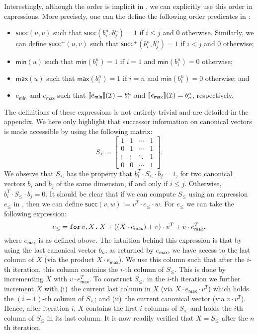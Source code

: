 Interestingly, although the order is implicit in \langfor, we can explicitly use this order in \langfor expressions. More precisely, one can the define the following order predicates in \langfor\!:
\begin{itemize}
	\item $\mathsf{succ}(u,v)$ such that $\mathsf{succ}(b_i^n,b_j^n)=1$ if $i\leq j$ and $0$ otherwise. Similarly, we can define
	$\mathsf{succ}^+(u,v)$ such that  $\mathsf{succ}^+(b_i^n,b_j^n)=1$ if $i < j$ and $0$ otherwise;
	\item $\mathsf{min}(u)$ such that  $\mathsf{min}(b_i^n)=1$ if $i=1$ and $\mathsf{min}(b_i^n)=0$ otherwise; 
	\item $\mathsf{max}(u)$ such that  $\mathsf{max}(b_i^n)=1$ if $i=n$ and $\mathsf{min}(b_i^n)=0$ otherwise; and
	\item $e_{\mathsf{min}}$ and $e_{\mathsf{max}}$ such that $\llbracket e_{\mathsf{min}} \rrbracket(\mathcal{I})=b_1^n$ and 
	$\llbracket e_{\mathsf{max}} \rrbracket(\mathcal{I})=b_n^n$, respectively.
\end{itemize}
The definitions of these expressions is not entirely trivial and are detailed in the appendix.
We here only highlight that successor information on canonical vectors is made accessible by
using the following matrix:
%
\[
S_{\leq} = \begin{bmatrix}
1 & 1 & \cdots &  1 \\
0 & 1 & \cdots & 1\\
\vdots & \vdots & \ddots & 1 \\
0 & 0 & \cdots & 1 
\end{bmatrix}.
\] 
We observe that $S_{\leq}$ has the property that $b_i^T\cdot S_{\leq} \cdot b_j=1$, for two canonical vectors $b_i$ and $b_j$ of the same dimension, if and only if $i\leq j$. Otherwise, $b_i^T\cdot S_{\leq} \cdot b_j=0$. It should be clear that if we can compute $S_{\leq}$ using an expression $e_{\leq}$ in \langfor, then we can define
$
\mathsf{succ}(v,w):=v^T\cdot e_{\leq} \cdot w.
$
For $e_{\leq}$ we can take the following \langfor expression:
$$
e_{\leq}=\texttt{for}\, v,X \texttt{.}\, X + \left((X\cdot e_{\mathsf{max}}) + v \right)\cdot v^T + v\cdot e^T_{\mathsf{max}},
$$
where $e_{\mathsf{max}}$ is as defined above. The intuition behind this expression is that by using the last canonical vector $b_n$, as returned by $e_{\mathsf{max}}$, we have access to the last column of $X$ (via the product $X\cdot e_{\mathsf{max}}$). We use this column such that after the $i$-th iteration, this column contains the $i$-th column of $S_{\leq}$. This is done by incrementing $X$ with $v\cdot e_{\mathsf{max}}^T$.
To construct $S_{\leq}$, in the $i$-th iteration we further increment $X$ with 
(i)~the current last column in $X$ (via $X\cdot e_{\mathsf{max}}\cdot v^T$) which holds
the $(i-1)$-th column of $S_{\leq}$; and (ii)~the current canonical vector (via $v\cdot v^T$). Hence, after iteration $i$, $X$ contains the first $i$ columns of $S_{\leq}$ and holds the $i$th column of $S_{\leq}$ in its last column. It is now readily verified that $X=S_{\leq}$ after the $n$th iteration.

